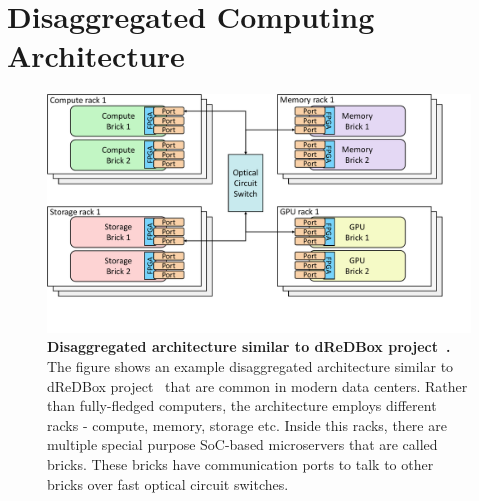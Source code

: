 \section{Disaggregated Computing Architecture}
\label{ch:background:disaggregated}



\begin{figure}[t]
  \centering
    \includegraphics[trim={0 2cm 2cm 0},clip,width=\linewidth]{chapters/background/figures/disaggregated_1.pdf}
    \caption[Disaggregated architecture similar to dReDBox project]{\textbf{Disaggregated architecture similar to dReDBox project~\cite{dis1}.} The figure shows an example disaggregated architecture similar to dReDBox project~\cite{dis1} that are common in modern data centers. Rather than fully-fledged computers, the architecture employs different racks - compute, memory, storage etc. Inside this racks, there are multiple special purpose SoC-based microservers that are called bricks. These bricks have communication ports to talk to other bricks over fast optical circuit switches.}
    \label{fig:disagg_bg}
\end{figure}


